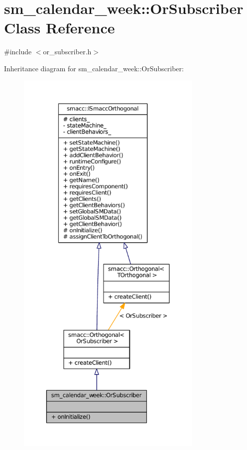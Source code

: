 \hypertarget{classsm__calendar__week_1_1OrSubscriber}{}\section{sm\+\_\+calendar\+\_\+week\+:\+:Or\+Subscriber Class Reference}
\label{classsm__calendar__week_1_1OrSubscriber}


{\ttfamily \#include $<$or\+\_\+subscriber.\+h$>$}



Inheritance diagram for sm\+\_\+calendar\+\_\+week\+:\+:Or\+Subscriber\+:
\nopagebreak
\begin{figure}[H]
\begin{center}
\leavevmode
\includegraphics[height=550pt]{classsm__calendar__week_1_1OrSubscriber__inherit__graph}
\end{center}
\end{figure}


